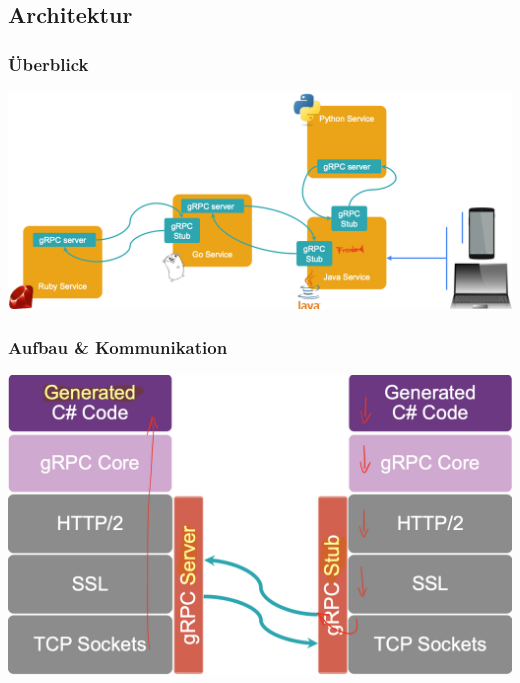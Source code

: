 \subsection{Architektur}
\subsubsection{Überblick}
\begin{center}
    \includegraphics[scale=.35]{graphic/gprc/Systembeispiel.png}
\end{center}
\vspace{-8pt}

\subsubsection{Aufbau \& Kommunikation}
\begin{center}
    \includegraphics[scale=.3]{graphic/gprc/aufbau.png}
\end{center}
\vspace{-8pt}

